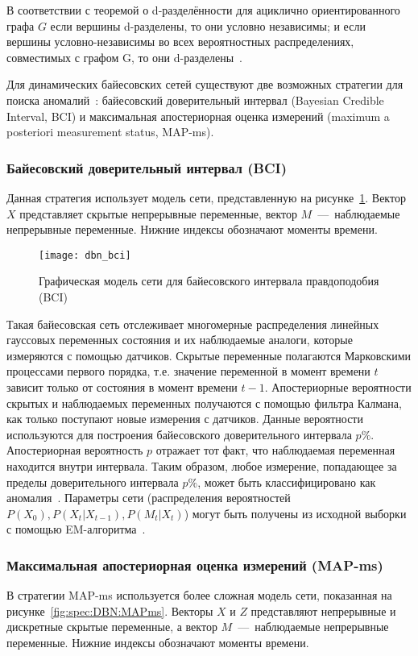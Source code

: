 В соответствии с теоремой о d-разделённости для ациклично ориентированного графа $G$ если вершины d-разделены, то они условно независимы; и если вершины условно-независимы во всех вероятностных распределениях, совместимых с графом G, то они d-разделены~\cite{PearlDynamicBayesianNetworks}.

Для динамических байесовских сетей существуют две возможных стратегии для поиска аномалий~\cite{DBNAnomalyDetection}: байесовский доверительный интервал (Bayesian Credible Interval, BCI) и максимальная апостериорная оценка измерений (maximum a posteriori measurement status, MAP-ms).

\subsubsection{Байесовский доверительный интервал (BCI)}
\label{subsubsec:spec:DBN:BCI}
Данная стратегия использует модель сети, представленную на рисунке~\ref{fig:spec:DBN:BCI}. Вектор $X$ представляет скрытые непрерывные переменные, вектор $M$~---~наблюдаемые непрерывные переменные. Нижние индексы обозначают моменты времени.

\begin{figure}[h]
\texttt{[image: dbn\_bci]}
\caption{Графическая модель сети для байесовского интервала правдоподобия (BCI)}
\label{fig:spec:DBN:BCI}
\end{figure}

Такая байесовская сеть отслеживает многомерные распределения линейных гауссовых переменных состояния и их наблюдаемые аналоги, которые измеряются с помощью датчиков. Скрытые переменные полагаются Марковскими процессами первого порядка, т.е. значение переменной в момент времени $t$ зависит только от состояния в момент времени $t-1$. Апостериорные вероятности скрытых и наблюдаемых переменных получаются с помощью фильтра Калмана, как только поступают новые измерения с датчиков. Данные вероятности используются для построения байесовского доверительного интервала $p\%$. Апостериорная вероятность $p$ отражает тот факт, что наблюдаемая переменная находится внутри интервала. Таким образом, любое измерение, попадающее за пределы доверительного интервала $p\%$, может быть классифицировано как аномалия~\cite{DBNAnomalyDetection}. Параметры сети (распределения вероятностей $P(X_0), P(X_t|X_{t-1}), P(M_t|X_t)$) могут быть получены из исходной выборки с помощью EM-алгоритма~\cite{KorolevEMAlgo}.

\subsubsection{Максимальная апостериорная оценка измерений (MAP-ms)}
В стратегии MAP-ms используется более сложная модель сети, показанная на рисунке~\ref{fig:spec:DBN:MAPms}. Векторы $X$ и $Z$ представляют непрерывные и дискретные скрытые переменные, а вектор $M$~---~наблюдаемые непрерывные переменные. Нижние индексы обозначают моменты времени.

